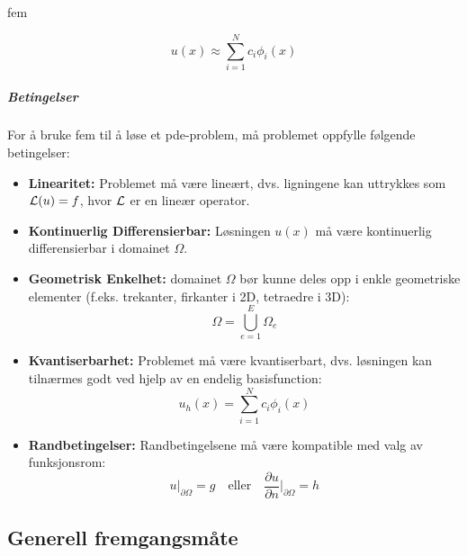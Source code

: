\chapter{}

\glsdesc{fem}

\begin{equation}
  u(x) \approx \sum_{i=1}^N c_i \phi_i(x)
\end{equation}

\paragraph{Betingelser}

For å bruke \gls{fem} til å løse et \gls{pde}-problem, må problemet oppfylle følgende betingelser:

\begin{itemize}
  \item \textbf{Linearitet:} Problemet må være lineært, dvs. ligningene kan uttrykkes som \(\mathcal{L}(u) = f\), hvor \(\mathcal{L}\) er en lineær operator.
  \item \textbf{Kontinuerlig Differensierbar:} Løsningen \( u(x) \) må være kontinuerlig differensierbar i \gls{domain}et \( \Omega \).
  \item \textbf{Geometrisk Enkelhet:} \gls{domain}et \( \Omega \) bør kunne deles opp i enkle geometriske elementer (f.eks. trekanter, firkanter i 2D, tetraedre i 3D):
        \[
          \Omega = \bigcup_{e=1}^{E} \Omega_e
        \]
  \item \textbf{Kvantiserbarhet:} Problemet må være kvantiserbart, dvs. løsningen kan tilnærmes godt ved hjelp av en endelig \gls{basisfunction}:
        \[
          u_h(x) = \sum_{i=1}^{N} c_i \phi_i(x)
        \]
  \item \textbf{Randbetingelser:} Randbetingelsene må være kompatible med valg av funksjonsrom:
        \[
          u|_{\partial \Omega} = g \quad \text{eller} \quad \frac{\partial u}{\partial n}\bigg|_{\partial \Omega} = h
        \]
\end{itemize}

\section{Generell fremgangsmåte}

